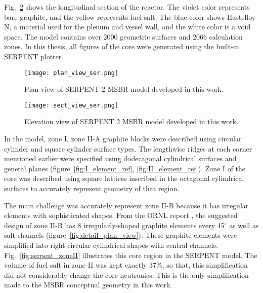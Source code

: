 Fig.~\ref{fig:serpent_sectional_view} shows the longitudinal section of the reactor. The violet color represents bare graphite, and the yellow represents fuel salt. The blue color shows Hastelloy-N, a material used for the plenum and vessel wall, and the white color is a void space. The model contains over 2000 geometric surfaces and 2066 calculation zones. In this thesis, all figures of the core were generated using the built-in SERPENT plotter.

\begin{figure}[hbp!] %
  \centering
  \vspace{-0.3em}
  \texttt{[image: plan\_view\_ser.png]}
  \caption{Plan view of SERPENT 2 \gls{MSBR} model developed in this work.}
  \vspace{-0.6em}
  \label{fig:serpent_plan_view}
\end{figure}
\FloatBarrier

\begin{figure}[hbp!] %
  \centering
  \vspace{-0.3em}
  \texttt{[image: sect\_view\_ser.png]}
  \caption{Elevation view of SERPENT 2 \gls{MSBR} model developed in this work.}
  \vspace{-0.6em}
  \label{fig:serpent_sectional_view}
\end{figure}
\FloatBarrier

In the model, zone I, zone II-A graphite blocks were described using circular cylinder and square cylinder surface types. The lengthwise ridges at each corner mentioned earlier were specified using dodecagonal cylindrical surfaces and general planes (figure~\ref{fig:I_element_ref}, \ref{fig:II_element_ref}). Zone I of the core was described using square lattices inscribed in the octagonal cylindrical surfaces to accurately represent geometry of that region.

The main challenge was accurately represent zone II-B because it has irregular elements with sophisticated shapes. From the \gls{ORNL} report \cite{robertson_conceptual_1971}, the suggested design of zone II-B has 8 irregularly-shaped graphite elements every 45$^\circ$ as well as salt channels (figure~\ref{fig:detail_plan_view}). These graphite elements were simplified into right-circular cylindrical shapes  with central channels. Fig.~\ref{fig:serpent_zoneII} illustrates this core region in the SERPENT model. The volume of fuel salt in zone II was kept exactly 37\%, so that, this simplification did not considerably change the core neutronics. This is the only simplification made to the \gls{MSBR} conceptual geometry in this work. 

